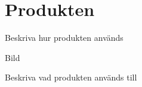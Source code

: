 \documentclass[tekniskrapport/tech.tex]{subfiles}
\begin{document}
\section{Produkten}
Beskriva hur produkten används

Bild

Beskriva vad produkten används till
\end{document}
